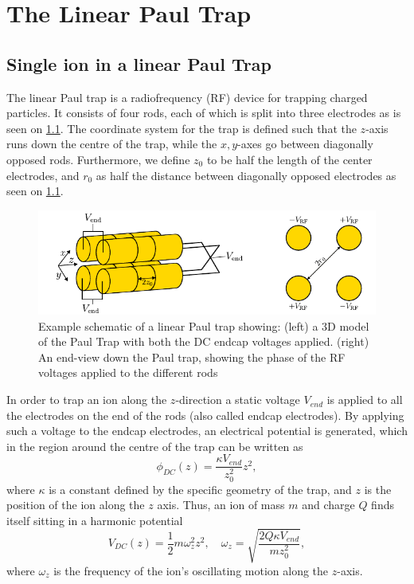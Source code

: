 \chapter{The Linear Paul Trap}
\label{chap:LinTrap}

\section{Single ion in a linear Paul Trap}
\label{sec:1Ion}
The linear Paul trap is a radiofrequency (RF) device for trapping charged particles. It consists of four rods, each of which is split into three electrodes as is seen on \cref{fig:PaulTrap}. The coordinate system for the trap is defined such that the $z$-axis runs down the centre of the trap,
while the $x,y$-axes go between diagonally opposed rods. Furthermore, we define $z_0$ to be half the length of the center electrodes, and $r_0$ as half the distance between diagonally opposed electrodes as seen on \cref{fig:PaulTrap}.
\begin{figure}
    \centering
    \includegraphics{main/Paul_Trap.pdf}
    \caption{Example schematic of a linear Paul trap showing: (left) a 3D model of the Paul Trap with both the DC endcap voltages applied.
    (right) An end-view down the Paul trap, showing the phase of the RF voltages applied to the different rods}
    \label{fig:PaulTrap}
\end{figure}


In order to trap an ion along the $z$-direction a static voltage $V_{end}$ is applied to all the electrodes on the end of the rods (also called endcap electrodes). By applying such a voltage to the endcap electrodes, an electrical potential is generated, which in the region around the centre of the trap can be written as
\begin{equation}
    \phi_{DC}(z) = \frac{\kappa V_{end}}{z_0^2}z^2,
    \label{eq:phi_DC_z} 
\end{equation}
where $\kappa$ is a constant defined by the specific geometry of the trap, and $z$ is the position of the ion along the $z$ axis.
Thus, an ion of mass $m$ and charge $Q$ finds itself sitting in a harmonic potential
\begin{equation}
    \label{eq:omega_z}
    V_{DC}(z) = \frac{1}{2}m\omega_z^2 z^2, \quad\omega_z = \sqrt{\frac{2Q\kappa V_{end}}{mz_0^2}},
\end{equation}
where $\omega_z$ is the frequency of the ion's oscillating motion along the $z$-axis.


